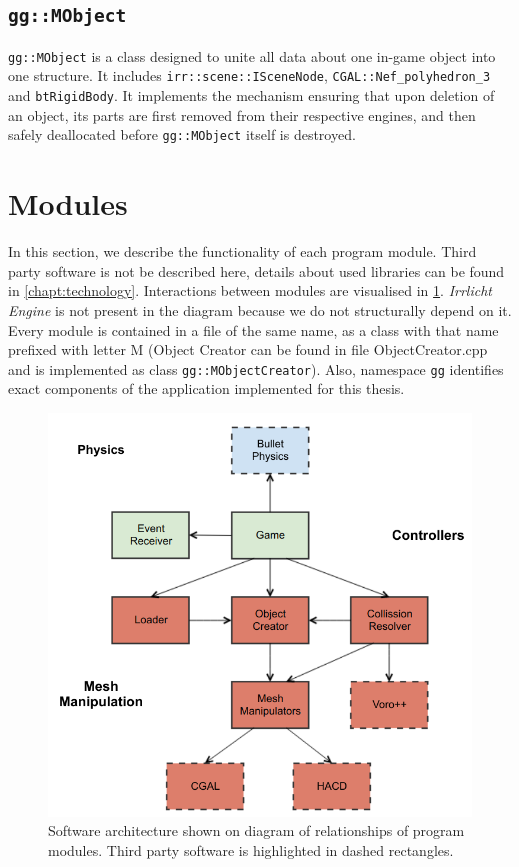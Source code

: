 \subsection*{\tt gg::MObject} 
{\tt gg::MObject} is a class designed to unite all data about one in-game object into one structure. It includes {\tt irr::scene::ISceneNode}, {\tt CGAL::Nef\_polyhedron\_3} and {\tt btRigidBody}. It implements the mechanism ensuring that upon deletion of an object, its parts are first removed from their respective engines, and then safely deallocated before {\tt gg::MObject} itself is destroyed.


\section{Modules}
In this section, we describe the functionality of each program module. Third party software is not be described here, details about used libraries can be found in \cref{chapt:technology}. Interactions between modules are visualised in \cref{fig:modules}. \emph{Irrlicht Engine} is not present in the diagram because we do not structurally depend on it. Every module is contained in a file of the same name, as a class with that name prefixed with letter M (\ie Object Creator can be found in file ObjectCreator.cpp and is implemented as class {\tt gg::MObjectCreator}). Also, namespace {\tt gg} identifies exact components of the application implemented for this thesis.

\begin{figure}
        \centering
        \includegraphics[width=\textwidth]{img/objectmodel}
        \caption{Software architecture shown on diagram of relationships of program modules. Third party software is highlighted in dashed rectangles.}
        \label{fig:modules}
\end{figure}

